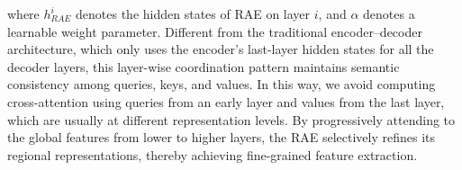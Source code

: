 
where $h_{RAE}^{i}$ denotes the hidden states of RAE on layer $i$, and $\alpha$ denotes a learnable weight parameter. Different from the traditional encoder–decoder architecture, which only uses the encoder’s last-layer hidden states for all the decoder layers, this layer-wise coordination pattern maintains semantic consistency among queries, keys, and values. In this way, we avoid computing cross-attention using queries from an early layer and values from the last layer, which are usually at different representation levels. By progressively attending to the global features from lower to higher layers, the RAE selectively refines its regional representations, thereby achieving fine-grained feature extraction.